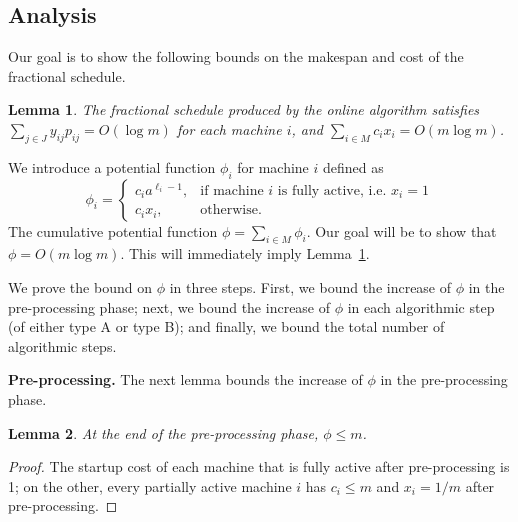 \documentclass[11pt]{article}
\newtheorem{lemma}{Lemma}
\begin{document}
\subsection{Analysis}
Our goal is to show the following bounds
on the makespan and cost of the fractional schedule.
\begin{lemma}\label{lma:fractional-main}
The fractional schedule produced by the online algorithm satisfies 
$\sum_{j\in J} y_{ij} p_{ij} = O(\log m)$ 
for each machine $i$, and  
$\sum_{i\in M} c_i x_i = O(m\log m)$.
\end{lemma}
\noindent
We introduce a potential function $\phi_i$ for machine $i$ defined as 
\begin{equation*}
\phi_i = \left\{ \begin{array}{ll}
c_i a^{\ell_i-1}, & \text{if machine $i$ is fully active, i.e. $x_i = 1$} \\
c_i x_i, & \text{otherwise.}
\end{array}\right.
\end{equation*}
The cumulative potential function $\phi = \sum_{i\in M} \phi_i$.
Our goal will be to show that $\phi = O(m\log m)$. 
This will immediately imply Lemma~\ref{lma:fractional-main}.

We prove the bound on $\phi$ in three steps. First, we bound the increase of 
$\phi$ in the pre-processing phase; next, we bound the increase of $\phi$ in
each algorithmic step (of either type A or type B); and finally, we bound the 
total number of algorithmic steps. 

\noindent
{\bf Pre-processing.}
The next lemma bounds the increase of $\phi$ in the pre-processing phase.
\begin{lemma}
\label{lma:initial}
At the end of the pre-processing phase, $\phi \leq m$.
\end{lemma}
\begin{proof}
The startup cost of each machine that is fully active after pre-processing is 1;
on the other, every partially active machine $i$ has $c_i\leq m$ and $x_i = 1/m$
after pre-processing.
\end{proof}
\end{document}

